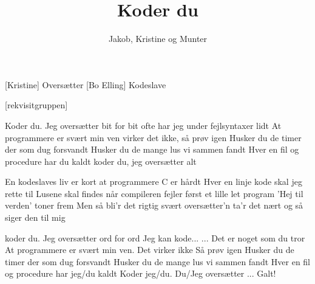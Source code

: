 \documentclass[a4paper,11pt]{article}
\title{Koder du}
\author{Jakob, Kristine og Munter}
\begin{document}
\maketitle

\begin{roles}  
[Kristine] Oversætter
[Bo Elling] Kodeslave
\end{roles}

\begin{props}
[rekvisitgruppen] 
\end{props}

\begin{song}
   Koder du. Jeg oversætter bit for bit
ofte har jeg under fejlsyntaxer lidt
At programmere er svært min ven
virker det ikke, så prøv igen
Husker du de timer der som dug forsvandt
Husker du de mange lus vi sammen fandt
Hver en fil og procedure har du kaldt
koder du, jeg oversætter alt

   En kodeslaves liv er kort
at programmere C er hårdt
Hver en linje kode skal jeg rette til
Lusene skal findes når
compileren fejler
først et lille let program
'Hej til verden' toner frem
Men så bli'r det rigtig svært
oversætter'n ta'r det nært
og så siger den til mig

   koder du. Jeg oversætter ord for ord
   Jeg kan kode...
   ... Det er noget som du tror
   At programmere er svært min ven.
   Det virker ikke
   Så prøv igen
   Husker du de timer der som dug forsvandt
   Husker du de mange lus vi sammen fandt
   Hver en fil og procedure har jeg/du kaldt
   Koder jeg/du. Du/Jeg oversætter ...
   Galt!



\end{song}
\end{document}
